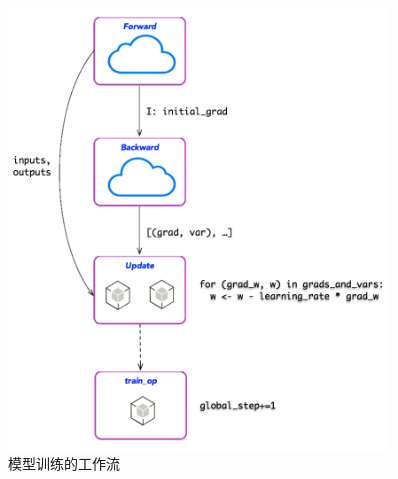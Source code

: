 \begin{content}
\begin{figure}[!h]
\centering
\includegraphics[width=0.9\textwidth]{figures/bp-train-pipeline.png}
\caption{模型训练的工作流}
 \label{fig:bp-train-pipeline}
\end{figure}

\end{content}
